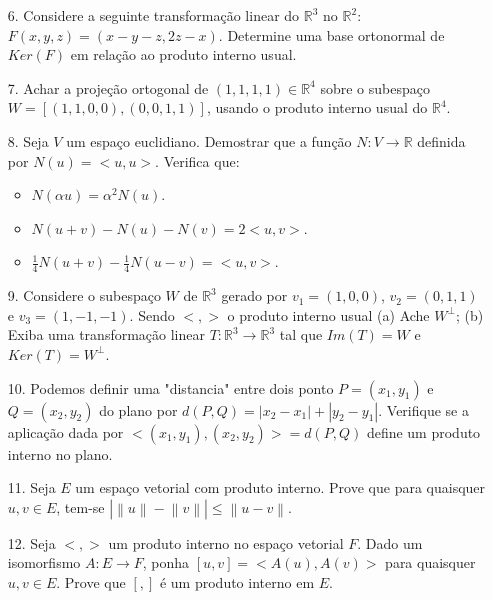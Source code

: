 \begin{itemize}
	\item[6.] Considere a seguinte transformação linear do $\mathbb{R}^{3}$ no $\mathbb{R}^{2}$: $F(x,y,z)=(x-y-z,2z-x)$. Determine uma base ortonormal de $Ker(F)$ em relação ao produto interno usual.
\end{itemize}
\begin{itemize}
	\item[7.] Achar a projeção ortogonal de $(1,1,1,1)\in\mathbb{R}^{4}$ sobre o subespaço $W=[(1,1,0,0),(0,0,1,1)]$, usando o produto interno usual do $\mathbb{R}^{4}$.
\end{itemize}
\begin{itemize}
	\item[8.]  Seja $V$ um espaço euclidiano. Demostrar que a função $N:V\rightarrow \mathbb{R}$ definida por $N(u)=<u,u>$. Verifica que:
	\begin{itemize}
		\item $N(\alpha u)=\alpha^{2}N(u)$.
		\item $N(u+v)-N(u)-N(v)=2<u,v>$.
		\item $\frac{1}{4}N(u+v)-\frac{1}{4}N(u-v)=<u,v>$.
	\end{itemize}
\end{itemize}
\begin{itemize}
	\item[9.] Considere o subespaço $W$ de $\mathbb{R}^{3}$ gerado por $v_{1}=(1,0,0)$, $v_{2}=(0,1,1)$ e $v_{3}=(1,-1,-1)$. Sendo $<,>$ o produto interno usual (a) Ache $W^{\bot}$; (b) Exiba uma transformação linear $T:\mathbb{R}^{3}\rightarrow\mathbb{R}^{3}$ tal que $Im(T)=W$ e $Ker(T)=W^{\bot}$.
\end{itemize}
\begin{itemize}
	\item[10.]Podemos definir uma "distancia" entre dois ponto $P=(x_{1},y_{1})$ e $Q=(x_{2},y_{2})$ do plano por $d(P,Q)=|x_{2}-x_{1}|+|y_{2}-y_{1}|$. Verifique se a aplicação dada por $<(x_{1},y_{1}),(x_{2},y_{2})>=d(P,Q)$ define um produto interno no plano.
\end{itemize}
\begin{itemize}
	\item[11.] Seja $E$ um espaço vetorial com produto interno. Prove que para quaisquer $u,v\in E$, tem-se $| \left\| u \right\| - \left\| v \right\| | \leq \left\| u-v \right\| $.
\end{itemize}
\begin{itemize}
	\item [12.] Seja $<,>$ um produto interno no espaço vetorial $F$. Dado um isomorfismo $A: E\rightarrow F$, ponha $[u,v]=<A(u),A(v)>$ para quaisquer $u,v \in E$. Prove que $[,]$ é um produto interno em $E$.
\end{itemize}





